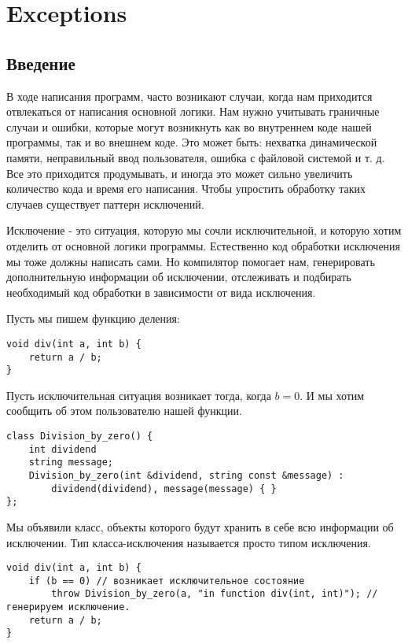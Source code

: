 \section{Exceptions}
\subsection{Введение}
В ходе написания программ, часто возникают случаи, когда нам приходится отвлекаться от написания основной логики. Нам нужно учитывать граничные случаи и ошибки, которые могут возникнуть как во внутреннем коде нашей программы, так и во внешнем коде. Это может быть: нехватка динамической памяти, неправильный ввод пользователя, ошибка с файловой системой и т. д.
Все это приходится продумывать, и иногда это может сильно увеличить количество кода и время его написания. Чтобы упростить обработку таких случаев существует паттерн исключений.

Исключение - это ситуация, которую мы сочли исключительной, и которую хотим отделить от основной логики программы. Естественно код обработки исключения мы тоже должны написать сами. Но компилятор помогает нам, генерировать дополнительную информации об исключении, отслеживать и подбирать необходимый код обработки в зависимости от вида исключения.

Пусть мы пишем функцию деления:
\begin{verbatim}
void div(int a, int b) {
    return a / b;
}
\end{verbatim}

Пусть исключительная ситуация возникает тогда, когда $b = 0$. И мы хотим сообщить об этом пользователю нашей функции.

\begin{verbatim}
class Division_by_zero() {
    int dividend
    string message;
    Division_by_zero(int &dividend, string const &message) :
        dividend(dividend), message(message) { }
};
\end{verbatim}

Мы объявили класс, объекты которого будут хранить в себе всю информации об исключении. Тип класса-исключения называется просто типом исключения.

\begin{verbatim}
void div(int a, int b) {
    if (b == 0) // возникает исключительное состояние
        throw Division_by_zero(a, "in function div(int, int)"); // генерируем исключение.
    return a / b;
}
\end{verbatim}

